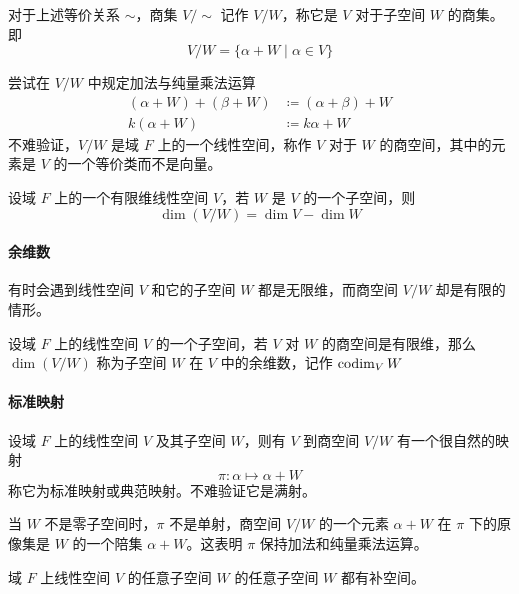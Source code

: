 对于上述等价关系 $\sim$，商集 $V/\sim$ 记作 $V/W$，称它是 $V$ 对于子空间 $W$ 的商集。即
\[ V/W = \{ \alpha + W \mid \alpha \in V \} \]

尝试在 $V/W$ 中规定加法与纯量乘法运算
\begin{equation*}
    \begin{aligned}
        (\alpha + W) + (\beta + W) & \coloneqq (\alpha + \beta) + W \\
        k(\alpha + W)              & \coloneqq k\alpha + W
    \end{aligned}
\end{equation*}
不难验证，$V/W$ 是域 $F$ 上的一个线性空间，称作 $V$ 对于 $W$ 的商空间，其中的元素是 $V$ 的一个等价类而不是向量。

\begin{theorem}
    设域 $F$ 上的一个有限维线性空间 $V$，若 $W$ 是 $V$ 的一个子空间，则
    \[ \dim(V/W) = \dim V - \dim W \]
\end{theorem}

\paragraph{余维数}

有时会遇到线性空间 $V$ 和它的子空间 $W$ 都是无限维，而商空间 $V/W$ 却是有限的情形。

\begin{definition}[余维数]
    设域 $F$ 上的线性空间 $V$ 的一个子空间，若 $V$ 对 $W$ 的商空间是有限维，那么 $\dim(V/W)$ 称为子空间 $W$ 在 $V$ 中的余维数，记作 $\operatorname{codim}_V W$
\end{definition}

\paragraph{标准映射}

设域 $F$ 上的线性空间 $V$ 及其子空间 $W$，则有 $V$ 到商空间 $V/W$ 有一个很自然的映射
\[ \pi : \alpha \mapsto \alpha + W \]
称它为标准映射或典范映射。不难验证它是满射。

当 $W$ 不是零子空间时，$\pi$ 不是单射，商空间 $V/W$ 的一个元素 $\alpha + W$ 在 $\pi$ 下的原像集是 $W$ 的一个陪集 $\alpha + W$。这表明 $\pi$ 保持加法和纯量乘法运算。

\begin{theorem}
    域 $F$ 上线性空间 $V$ 的任意子空间 $W$ 的任意子空间 $W$ 都有补空间。
\end{theorem}


